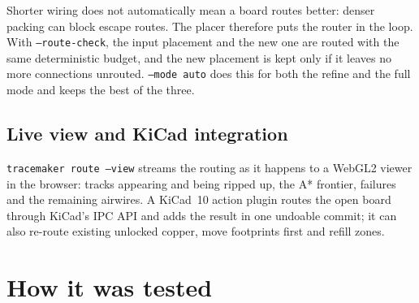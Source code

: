 \documentclass[10pt,a4paper]{article}
\begin{document}
Shorter wiring does not automatically mean a board routes better: denser packing can block escape routes. The
placer therefore puts the router in the loop. With \texttt{--route-check}, the input placement and the new one are
routed with the same deterministic budget, and the new placement is kept only if it leaves no more connections
unrouted. \texttt{--mode auto} does this for both the refine and the full mode and keeps the best of the three.

\subsection{Live view and KiCad integration}

\texttt{tracemaker route --view} streams the routing as it happens to a WebGL2 viewer in the browser: tracks
appearing and being ripped up, the A* frontier, failures and the remaining airwires. A KiCad~10 action plugin
routes the open board through KiCad's IPC API and adds the result in one undoable commit; it can also re-route
existing unlocked copper, move footprints first and refill zones.

\section{How it was tested}
\label{sec:testing}
\end{document}
